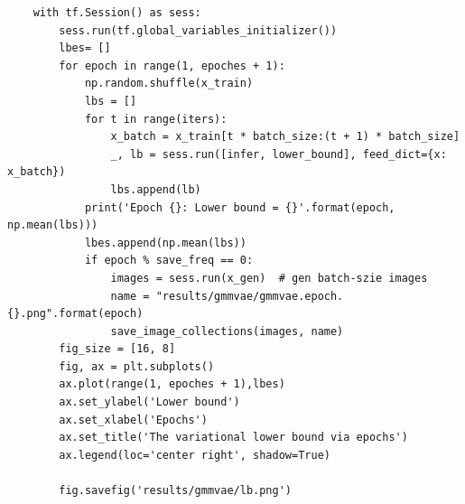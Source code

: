 \documentclass[a4paper]{article}
\begin{document}
\begin{verbatim}
    with tf.Session() as sess:
        sess.run(tf.global_variables_initializer())
        lbes= [] 
        for epoch in range(1, epoches + 1):
            np.random.shuffle(x_train)
            lbs = []
            for t in range(iters):
                x_batch = x_train[t * batch_size:(t + 1) * batch_size]
                _, lb = sess.run([infer, lower_bound], feed_dict={x: x_batch})
                lbs.append(lb)
            print('Epoch {}: Lower bound = {}'.format(epoch, np.mean(lbs)))
            lbes.append(np.mean(lbs))
            if epoch % save_freq == 0:
                images = sess.run(x_gen)  # gen batch-szie images
                name = "results/gmmvae/gmmvae.epoch.{}.png".format(epoch)
                save_image_collections(images, name)
        fig_size = [16, 8]
        fig, ax = plt.subplots()
        ax.plot(range(1, epoches + 1),lbes)
        ax.set_ylabel('Lower bound')
        ax.set_xlabel('Epochs')
        ax.set_title('The variational lower bound via epochs')
        ax.legend(loc='center right', shadow=True)
        
        fig.savefig('results/gmmvae/lb.png')

\end{verbatim}




%
\end{document}
